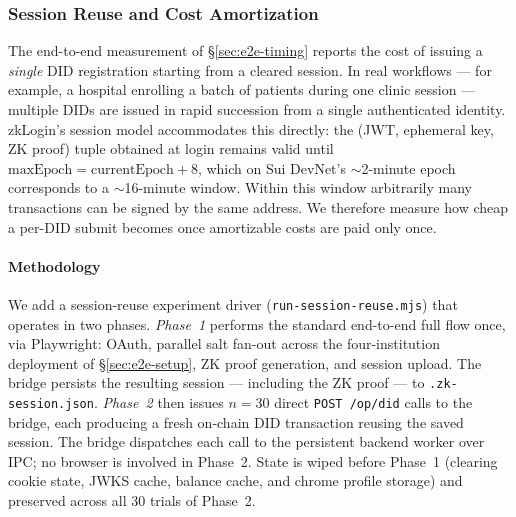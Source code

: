 %
%
%

\subsubsection{Session Reuse and Cost Amortization}
\label{sec:session-reuse}

The end-to-end measurement of \S\ref{sec:e2e-timing} reports the cost of
issuing a \emph{single} DID registration starting from a cleared
session. In real workflows — for example, a hospital enrolling a batch
of patients during one clinic session — multiple DIDs are issued in
rapid succession from a single authenticated identity. zkLogin's
session model accommodates this directly: the (JWT, ephemeral key, ZK
proof) tuple obtained at login remains valid until \(\text{maxEpoch} =
\text{currentEpoch} + 8\), which on Sui DevNet's \(\sim\)2-minute
epoch corresponds to a \(\sim\)16-minute window. Within this window
arbitrarily many transactions can be signed by the same address. We
therefore measure how cheap a per-DID submit becomes once
amortizable costs are paid only once.

\paragraph{Methodology}
\label{sec:session-reuse-methodology}

We add a session-reuse experiment driver
(\texttt{run-session-reuse.mjs}) that operates in two phases. \emph{Phase~1}
performs the standard end-to-end full flow once, via Playwright: OAuth,
parallel salt fan-out across the four-institution deployment of
\S\ref{sec:e2e-setup}, ZK proof generation, and session upload. The
bridge persists the resulting session — including the ZK proof — to
\texttt{.zk-session.json}. \emph{Phase~2} then issues $n=30$ direct
\texttt{POST /op/did} calls to the bridge, each producing a fresh
on-chain DID transaction reusing the saved session. The bridge
dispatches each call to the persistent backend worker over IPC; no
browser is involved in Phase~2. State is wiped before Phase~1 (clearing
cookie state, JWKS cache, balance cache, and chrome profile storage)
and preserved across all 30 trials of Phase~2.

